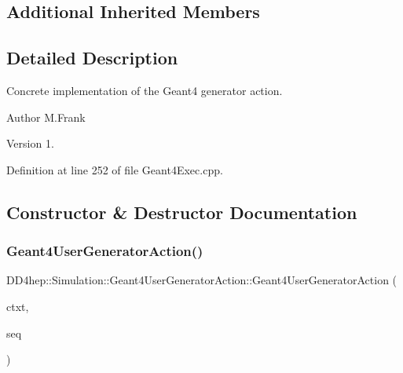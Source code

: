 \subsection*{Additional Inherited Members}


\subsection{Detailed Description}
Concrete implementation of the Geant4 generator action. 

\begin{DoxyAuthor}{Author}
M.\+Frank 
\end{DoxyAuthor}
\begin{DoxyVersion}{Version}
1. 
\end{DoxyVersion}


Definition at line 252 of file Geant4\+Exec.\+cpp.



\subsection{Constructor \& Destructor Documentation}
\hypertarget{class_d_d4hep_1_1_simulation_1_1_geant4_user_generator_action_afc51c8fd156ae7c8a344d1378c2b2026}{}\label{class_d_d4hep_1_1_simulation_1_1_geant4_user_generator_action_afc51c8fd156ae7c8a344d1378c2b2026} 
\subsubsection{\texorpdfstring{Geant4\+User\+Generator\+Action()}{Geant4UserGeneratorAction()}}
{\footnotesize\ttfamily D\+D4hep\+::\+Simulation\+::\+Geant4\+User\+Generator\+Action\+::\+Geant4\+User\+Generator\+Action (\begin{DoxyParamCaption}\item[{\hyperlink{class_d_d4hep_1_1_simulation_1_1_geant4_context}{Geant4\+Context} $\ast$}]{ctxt,  }\item[{\hyperlink{class_d_d4hep_1_1_simulation_1_1_geant4_generator_action_sequence}{Geant4\+Generator\+Action\+Sequence} $\ast$}]{seq }\end{DoxyParamCaption})\hspace{0.3cm}{\ttfamily [inline]}}




